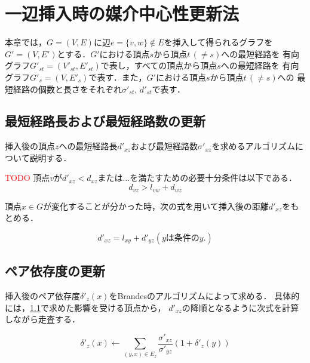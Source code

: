 \chapter{一辺挿入時の媒介中心性更新法}
\label{chap:update-bc-on-insert}
本章では，$G=(V,E)$に辺$e=\{v,w\} \not\in E$を挿入して得られるグラフを
$G'=(V,E')$とする．$G'$における頂点$s$から頂点$t\,(\neq s)$への最短経路を
有向グラフ$G'_{st}=(V'_{st},E'_{st})$で表し，すべての頂点から頂点$s$への最短経路を
有向グラフ$G'_s=(V,E'_s)$で表す．また，$G'$における頂点$s$から頂点$t\,(\neq s)$への
最短経路の個数と長さをそれぞれ$\sigma'_{st}$, $d'_{st}$で表す．

\section{最短経路長および最短経路数の更新}
\label{sect:update-augdist-on-insert}

挿入後の頂点$z$への最短経路長$d'_{xz}$および最短経路数$\sigma'_{xz}$を求めるアルゴリズムについて説明する．

\begin{lemma-without-proof}
  \textcolor{red}{TODO}
  頂点$v$が$d'_{xz}<d_{xz}$または...を満たすための必要十分条件は以下である．
  \begin{equation*}
    d_{vz}>l_{vw}+d_{wz}
  \end{equation*}
\end{lemma-without-proof}

頂点$x\in G$が変化することが分かった時，次の式を用いて挿入後の距離$d'_{xz}$をもとめる．

\begin{corollary-without-proof}
  \begin{equation*}
    d'_{xz}=l_{xy}+d'_{yz} (y\mathrm{は条件の}y.)
  \end{equation*}
\end{corollary-without-proof}

\section{ペア依存度の更新}
\label{sect:update-delta-on-delete}

挿入後のペア依存度$\delta'_z(x)$をBrandesのアルゴリズムによって求める．
具体的には，\ref{sect:update-augdist-on-insert}で求めた影響を受ける頂点から，
$d'_{xz}$の降順となるように次式を計算しながら走査する．

\[ \delta'_{z}(x)\gets\sum_{(y,x)\in E_z}\frac{\sigma'_{xz}}{\sigma'_{yz}}(1+\delta'_z(y)) \]
